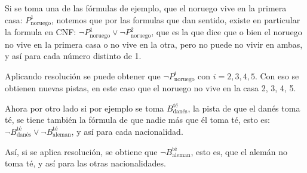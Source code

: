 \documentclass[letterpaper,10pt]{article}
\begin{document}
\begin{enumerate}[a)]
Si se toma una de las fórmulas de ejemplo, que el noruego vive en la primera casa: $P_\text{noruego}^1$, notemos que por las formulas que dan sentido, existe en particular la formula en CNF: $\neg P_\text{noruego}^1 \vee \neg P_\text{noruego}^2$, que es la que dice que o bien el noruego no vive en la primera casa o no vive en la otra, pero no puede no vivir en ambas, y así para cada número distinto de 1.

Aplicando resolución se puede obtener que $\neg P_\text{noruego}^i$ con $i = 2,3,4,5$. Con eso se obtienen nuevas pistas, en este caso que el noruego no vive en la casa 2, 3, 4, 5.

Ahora por otro lado si por ejemplo se toma $B_\text{danés}^\text{té}$, la pista de que el danés toma té, se tiene también la fórmula de que nadie más que él toma té, esto es: $\neg B_\text{danés}^\text{té} \vee \neg B_\text{aleman}^\text{té}$, y así para cada nacionalidad.

Así, si se aplica resolución, se obtiene que $\neg B_\text{aleman}^\text{té}$, esto es, que el alemán no toma té, y así para las otras nacionalidades.
\end{enumerate}
\end{document}
